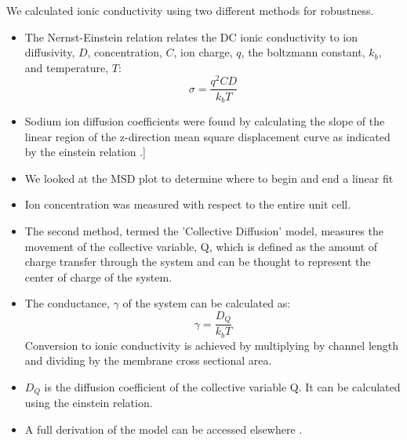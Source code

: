 \documentclass{article}
\begin{document}
  We calculated ionic conductivity using two different methods for robustness.
  \begin{itemize}
    \item The Nernst-Einstein relation relates the DC ionic conductivity to 
    ion diffusivity, $D$, concentration, $C$, ion charge, $q$, the boltzmann 
    constant, $k_b$, and temperature, $T$: $$\sigma = \dfrac{q^2CD}{k_b T}$$  %
    \item Sodium ion diffusion coefficients were found by calculating the slope
    of the linear region of the z-direction mean square displacement curve as indicated by
    the einstein relation \cite{einstein_investigations_1956}.]
    \item We looked at the MSD plot to determine where to begin and end a linear fit
    \item Ion concentration was measured with respect to the entire unit cell. 
    \item The second method, termed the 'Collective Diffusion' model, measures 
    the movement of the collective variable, Q, which is defined as the amount
    of charge transfer through the system and can be thought to represent
    the center of charge of the system.
    \item The conductance, $\gamma$ of the system can be calculated as:
    $$ \gamma = \dfrac{D_Q}{k_b T} $$ Conversion to ionic conductivity is
    achieved by multiplying by channel length and dividing by the membrane
    cross sectional area.
    \item $D_Q$ is the diffusion coefficient of the collective variable Q. It can
    be calculated using the einstein relation.
    \item A full derivation of the model can be accessed elsewhere \cite{liu_collective_2013}.
  \end{itemize}
    
\end{document}
